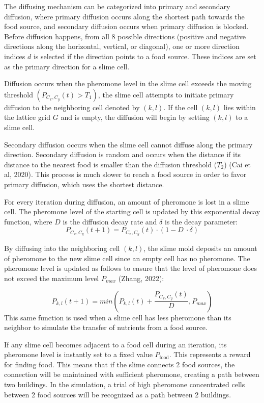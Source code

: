 \documentclass[11pt]{article}
\begin{document}
The diffusing mechanism can be categorized into primary and secondary diffusion, where primary diffusion occurs along the shortest path towards the food source, and secondary diffusion occurs when primary diffusion is blocked. 
Before diffusion happens, from all 8 possible directions (positive and negative directions along the horizontal, vertical, or diagonal), one or more direction indices $d$ is selected if the direction points to a food source. These indices are set as the primary direction for a slime cell. \par
Diffusion occurs when the pheromone level in the slime cell exceeds the moving threshold $(P_{C_x,C_y}\left(t\right)> T_1)$, the slime cell attempts to initiate primary diffusion to the neighboring cell denoted by $\left(k,l\right)$. If the cell $\left(k,l\right)$ lies within the lattice grid $G$ and is empty, the diffusion will begin by setting $\left(k,l\right)$ to a slime cell. \par
Secondary diffusion occurs when the slime cell cannot diffuse along the primary direction. Secondary diffusion is random and occurs when the distance if its distance to the nearest food is smaller than the diffusion threshold ($T_2$) (Cai et al, 2020). This process is much slower to reach a food source in order to favor primary diffusion, which uses the shortest distance. \par
 For every iteration during diffusion, an amount of pheromone is lost in a slime cell. The pheromone level of the starting cell is updated by this exponential decay function, where $D$ is the diffusion decay rate and $\delta$ is the decay parameter:
\[ P_{C_x,C_y}\left(t+1\right)=P_{C_x,C_y}\left(t\right)\cdot\left(1-D\ \cdot\delta\right)
\] \par
By diffusing into the neighboring cell $\left(k,l\right)$, the slime mold deposits an amount of pheromone to the new slime cell since an empty cell has no pheromone. The pheromone level is updated as follows to ensure that the level of pheromone does not exceed the maximum level $P_{max}$ (Zhang, 2022): \par
\[ P_{k,l}\left(t+1\right)=min{\left(P_{k,l}\left(t\right)+\frac{P_{C_x,C_y}\left(t\right)}{D},P_{max}\right)} \] 
This same function is used when a slime cell has less pheromone than its neighbor to simulate the transfer of nutrients from a food source. \par
	If any slime cell becomes adjacent to a food cell during an iteration, its pheromone level is instantly set to a fixed value $P_{\mathrm{food}}$. This represents a reward for finding food. This means that if the slime connects 2 food sources, the connection will be maintained with sufficient pheromone, creating a path between two buildings. In the simulation, a trial of high pheromone concentrated cells between 2 food sources will be recognized as a path between 2 buildings.  \par
\end{document}
